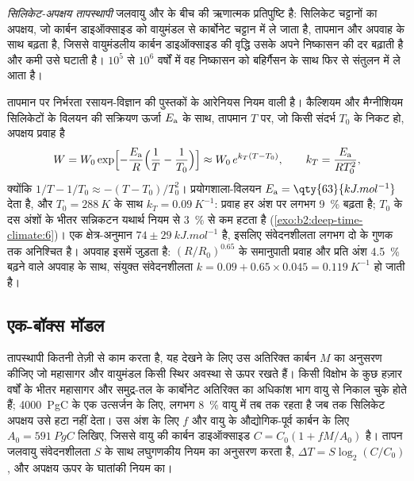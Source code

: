 \begin{definition}[सिलिकेट-अपक्षय तापस्थापी]\label{def:b2:deep-time-climate:thermostat}
\emph{सिलिकेट-अपक्षय तापस्थापी} जलवायु और  के बीच की ऋणात्मक प्रतिपुष्टि है: सिलिकेट चट्टानों का अपक्षय, जो
कार्बन डाइऑक्साइड को वायुमंडल से कार्बोनेट चट्टान में ले जाता है, तापमान और
अपवाह के साथ बढ़ता है, जिससे वायुमंडलीय कार्बन डाइऑक्साइड की वृद्धि उसके अपने निष्कासन की दर बढ़ाती है और
कमी उसे घटाती है। $10^5$ से $10^6$ वर्षों में वह निष्कासन को बहिर्गैसन के साथ फिर से
संतुलन में ले आता है।
\end{definition}

तापमान पर निर्भरता रसायन-विज्ञान की पुस्तकों के आरेनियस नियम वाली है। कैल्शियम और मैग्नीशियम
सिलिकेटों के विलयन की सक्रियण ऊर्जा $E_{\text a}$ के साथ, तापमान $T$ पर, जो किसी संदर्भ
$T_0$ के निकट हो, अपक्षय प्रवाह है
\[
  W = W_0 \exp\Bigl[-\frac{E_{\text a}}{R}\Bigl(\frac1T - \frac1{T_0}\Bigr)\Bigr]
  \approx W_0\, e^{k_T (T - T_0)}, \qquad k_T = \frac{E_{\text a}}{R T_0^2},
\]
क्योंकि $1/T - 1/T_0 \approx -(T - T_0)/T_0^2$। प्रयोगशाला-विलयन $E_{\text a} =
\qty{63}{kJ.mol^{-1}}$ देता है, और $T_0 = \qty{288}{K}$ के साथ $k_T = \qty{0.09}{K^{-1}}$: प्रवाह
हर अंश पर लगभग \qty{9}{\percent} बढ़ता है; $T_0$ के दस अंशों के भीतर सन्निकटन
यथार्थ नियम से \qty{3}{\percent} से कम हटता है (\cref{exo:b2:deep-time-climate:6})। एक क्षेत्र-अनुमान
$74 \pm \qty{29}{kJ.mol^{-1}}$ है, इसलिए संवेदनशीलता लगभग दो के गुणक तक अनिश्चित है। अपवाह
इसमें जुड़ता है: $(R/R_0)^{0.65}$ के समानुपाती प्रवाह और प्रति अंश \qty{4.5}{\percent} बढ़ने वाले अपवाह के साथ,
संयुक्त संवेदनशीलता $k = 0.09 + 0.65\times0.045 =
\qty{0.119}{K^{-1}}$ हो जाती है।

\subsection*{एक-बॉक्स मॉडल}

तापस्थापी कितनी तेज़ी से काम करता है, यह देखने के लिए उस अतिरिक्त कार्बन $M$ का अनुसरण कीजिए जो महासागर और वायुमंडल
किसी स्थिर अवस्था से ऊपर रखते हैं। किसी विक्षोभ के कुछ हज़ार वर्षों के भीतर महासागर और समुद्र-तल के
कार्बोनेट अतिरिक्त का अधिकांश भाग वायु से निकाल चुके होते हैं; \qty{4000}{PgC} के एक उत्सर्जन के लिए, लगभग
\qty{8}{\percent} वायु में तब तक रहता है जब तक सिलिकेट अपक्षय उसे हटा नहीं देता। उस अंश के लिए $f$
और वायु के औद्योगिक-पूर्व कार्बन के लिए $A_0 = \qty{591}{PgC}$ लिखिए, जिससे वायु की कार्बन डाइऑक्साइड
$C = C_0(1 + fM/A_0)$ है। तापन जलवायु संवेदनशीलता $S$ के साथ लघुगणकीय नियम का अनुसरण करता है,
$\Delta T = S\log_2(C/C_0)$, और अपक्षय ऊपर के घातांकी नियम का।

